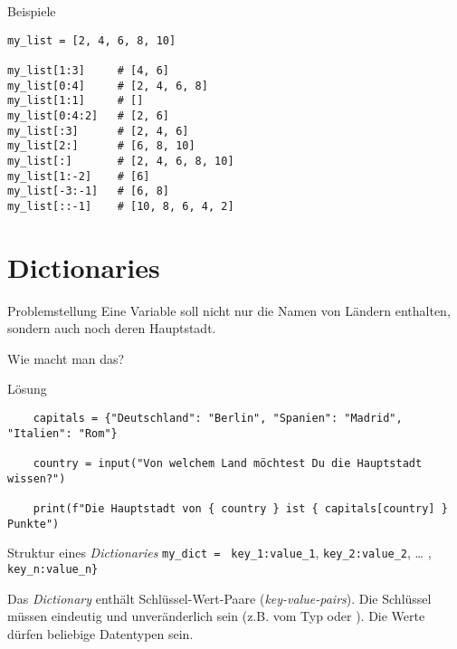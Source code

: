 \begin{fragile}
\begin{exampleblock}{Beispiele}
\begin{overprint}
\begin{verbatim}
my_list = [2, 4, 6, 8, 10]

my_list[1:3]     # [4, 6]
my_list[0:4]     # [2, 4, 6, 8]
my_list[1:1]     # []
my_list[0:4:2]   # [2, 6]
my_list[:3]      # [2, 4, 6]
my_list[2:]      # [6, 8, 10]
my_list[:]       # [2, 4, 6, 8, 10]
my_list[1:-2]    # [6]
my_list[-3:-1]   # [6, 8] 
my_list[::-1]    # [10, 8, 6, 4, 2]  
\end{verbatim}

\end{overprint}
\end{exampleblock}
\end{fragile}


\section{Dictionaries}

\begin{frame}
\begin{block}{Problemstellung}
\vspace{2pt}
Eine Variable soll nicht nur die Namen von Ländern enthalten, sondern auch noch deren Hauptstadt. 

\vspace{8pt}

Wie macht man das? 
\end{block}
\end{frame}

\begin{fragile}{}
\begin{block}{Lösung}
	\begin{verbatim}
	capitals = {"Deutschland": "Berlin", "Spanien": "Madrid", "Italien": "Rom"}
	
	country = input("Von welchem Land möchtest Du die Hauptstadt wissen?")
	
	print(f"Die Hauptstadt von { country } ist { capitals[country] } Punkte")
	\end{verbatim}
\end{block}
\end{fragile}

\begin{fragile}
	
	\begin{block}{Struktur eines \emph{Dictionaries}}
		\vspace{2pt}
		\large
		\texttt{my\_dict = }\pause {\Large\texttt{\{}}\pause 
		\texttt{key\_1}\pause\texttt{:}\pause\texttt{value\_1}\pause,
		\pause 
		\texttt{key\_2:value\_2}, \pause 
		\dots   
		, \texttt{key\_n:value\_n}\pause \Large{\texttt{\}}}
	\end{block}
	\pause 
	
	Das \emph{Dictionary}  enthält Schlüssel-Wert-Paare (\emph{key-value-pairs}). Die Schlüssel müssen eindeutig und unveränderlich sein (z.B. vom Typ  oder ). Die Werte dürfen beliebige Datentypen sein. 
	
\end{fragile}


